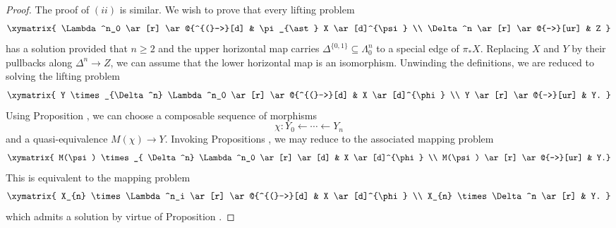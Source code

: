 \begin{proof}
The proof of $(ii)$ is similar. We wish to prove that every lifting problem
$$ \xymatrix{ \Lambda^n_0 \ar[r] \ar@{^{(}->}[d] & \pi_{\ast} X \ar[d]^{\psi} \\
\Delta^n \ar[r] \ar@{-->}[ur] & Z }$$
has a solution provided that $n \geq 2$ and the upper horizontal map carries $\Delta^{ \{0,1\} } \subseteq \Lambda^n_0$ to a special edge of $\pi_{\ast} X$. Replacing $X$ and $Y$ by their pullbacks along
$\Delta^n \rightarrow Z$, we can assume that the lower horizontal map is an isomorphism. 
Unwinding the definitions, we are reduced to solving the lifting problem
$$ \xymatrix{ Y \times_{\Delta^n} \Lambda^n_0 \ar[r] \ar@{^{(}->}[d] & X \ar[d]^{\phi} \\
Y \ar[r] \ar@{-->}[ur] & Y. }$$
Using Proposition , we can choose a composable sequence of morphisms
$$ \chi: Y_0 \leftarrow \cdots \leftarrow Y_{n} $$
and a quasi-equivalence $M(\chi) \rightarrow Y$. Invoking
Propositions , we may reduce to the associated mapping problem
$$ \xymatrix{ M(\psi) \times_{ \Delta^n} \Lambda^n_0 \ar[r] \ar[d] & X \ar[d]^{\phi} \\
M(\psi) \ar[r] \ar@{-->}[ur] & Y.}$$
This is equivalent to the mapping problem
$$ \xymatrix{ X_{n} \times \Lambda^n_i \ar[r] \ar@{^{(}->}[d] & X \ar[d]^{\phi} \\
X_{n} \times \Delta^n \ar[r] & Y. }$$
which admits a solution by virtue of Proposition .
\end{proof}

